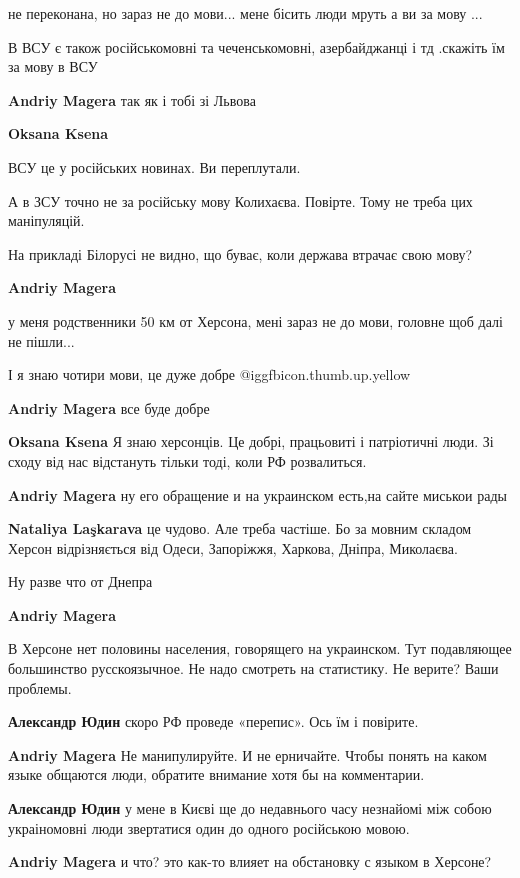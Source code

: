 \begin{itemize}
\begin{itemize}
не переконана, но зараз не до мови... мене бісить люди мруть а ви за мову ...

В ВСУ є також російськомовні та чеченськомовні, азербайджанці і тд .скажіть їм
за мову в ВСУ

\textbf{Andriy Magera} так як і тобі зі Львова

\textbf{Oksana Ksena} 

ВСУ це у російських новинах. Ви переплутали.

А в ЗСУ точно не за російську мову Колихаєва. Повірте. Тому не треба цих
маніпуляцій.

На прикладі Білорусі не видно, що буває, коли держава втрачає свою мову?

\textbf{Andriy Magera} 

у меня родственники 50 км от Херсона, мені зараз не до мови, головне щоб далі не пішли...

І я знаю чотири мови, це дуже добре  @igg{fbicon.thumb.up.yellow} 

\textbf{Andriy Magera} все буде добре

\textbf{Oksana Ksena} Я знаю херсонців. Це добрі, працьовиті і патріотичні люди.
Зі сходу від нас відстануть тільки тоді, коли РФ розвалиться.

\textbf{Andriy Magera} ну его обращение и на украинском есть,на сайте миськои рады

\textbf{Nataliya Laşkarava} це чудово. Але треба частіше. Бо за мовним складом Херсон відрізняється від Одеси, Запоріжжя, Харкова, Дніпра, Миколаєва.

Ну разве что от Днепра

\textbf{Andriy Magera} 

В Херсоне нет половины населения, говорящего на украинском. Тут подавляющее
большинство русскоязычное. Не надо смотреть на статистику. Не верите? Ваши
проблемы.

\textbf{Александр Юдин} скоро РФ проведе «перепис». Ось їм і повірите.

\textbf{Andriy Magera} Не манипулируйте. И не ерничайте. Чтобы понять на каком языке общаются люди, обратите внимание хотя бы на комментарии.

\textbf{Александр Юдин} у мене в Києві ще до недавнього часу незнайомі між собою украіномовні люди звертатися один до одного російською мовою.

\textbf{Andriy Magera} и что? это как-то влияет на обстановку с языком в Херсоне?

\end{itemize} %

\end{itemize} %



